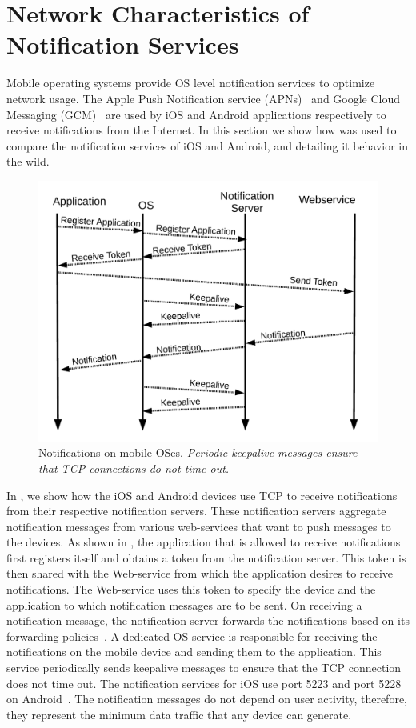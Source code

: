 \section{Network Characteristics of Notification Services}
\label{sec:characterize-os}

Mobile operating systems provide OS level notification services to optimize network usage.
The Apple Push Notification service (APNs)~\cite{apns} and Google Cloud Messaging (GCM)~\cite{gcm} are used by iOS and Android applications respectively to receive notifications from the Internet.
In this section we show how \platname was used to compare the notification services of iOS and Android, and detailing it behavior in the wild. 

\begin{figure}
\centering
\includegraphics[width=0.8\columnwidth]{figures/Notification.pdf}
\caption{Notifications on mobile OSes. \emph{Periodic keepalive messages ensure that TCP connections do not time out.}}
\label{fig:push-expt-interarrival}
\end{figure}

In , we show how the iOS and Android devices use TCP to receive notifications from their respective notification servers. 
These notification servers aggregate notification messages from various web-services that want to push messages to the devices.
As shown in , the application that is allowed to receive notifications first registers itself and obtains a token from the notification server.
This token is then shared with the Web-service from which the application desires to receive notifications. 
The Web-service uses this token to specify the device and the application to which notification messages are to be sent. 
On receiving a notification message, the notification server forwards the notifications based on its forwarding policies~\cite{apns, gcm}. 
A dedicated OS service is responsible for receiving the notifications on the mobile device and sending them to the application.
This service periodically sends keepalive messages to ensure that the TCP connection does not time out.
The notification services for iOS use port 5223 and port 5228 on Android~\cite{apns, gcm}.
The notification messages do not depend on user activity, therefore, they represent the minimum data traffic that any device can generate.

